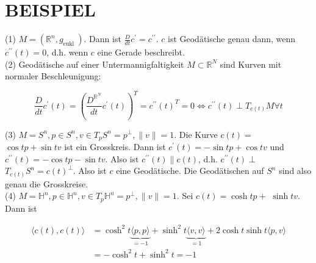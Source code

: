\documentclass[10pt]{article}
\begin{document}
\section*{BEISPIEL}
(1) $M=\left(\mathbb{R}^{n}, g_{\text {eukl }}\right)$. Dann ist $\frac{D}{d t} c^{\prime}=c^{\prime \prime}$. $c$ ist Geodätische genau dann, wenn $c^{\prime \prime}(t)=0$, d.h. wenn $c$ eine Gerade beschreibt.\\
(2) Geodätische auf einer Untermannigfaltigkeit $M \subset \mathbb{R}^{N}$ sind Kurven mit normaler Beschleunigung:

$$
\frac{D}{d t} c^{\prime}(t)=\left(\frac{D^{\mathbb{R}^{N}}}{d t} c^{\prime}(t)\right)^{T}=c^{\prime \prime}(t)^{T}=0 \Longleftrightarrow c^{\prime \prime}(t) \perp T_{c(t)} M \forall t
$$

(3) $M=S^{n}, p \in S^{n}, v \in T_{p} S^{n}=p^{\perp},\|v\|=1$. Die Kurve $c(t)=$ $\cos t p+\sin t v$ ist ein Grosskreis. Dann ist $c^{\prime}(t)=-\sin t p+\cos t v$ und $c^{\prime \prime}(t)=-\cos t p-\sin t v$. Also ist $c^{\prime \prime}(t) \| c(t)$, d.h. $c^{\prime \prime}(t) \perp$ $T_{c(t)} S^{n}=c(t)^{\perp}$. Also ist $c$ eine Geodätische. Die Geodätischen auf $S^{n}$ sind also genau die Grosskreise.\\
(4) $M=\mathbb{H}^{n}, p \in \mathbb{H}^{n}, v \in T_{p} \mathbb{H}^{n}=p^{\perp},\|v\|=1$. Sei $c(t)=\cosh t p+$ $\sinh t v$. Dann ist

$$
\begin{aligned}
\langle c(t), c(t)\rangle & =\cosh ^{2} t \underbrace{\langle p, p\rangle}_{=-1}+\sinh ^{2} t \underbrace{\langle v, v\rangle}_{=1}+2 \cosh t \sinh t\langle p, v\rangle \\
& =-\cosh ^{2} t+\sinh ^{2} t=-1
\end{aligned}
$$
\end{document}
